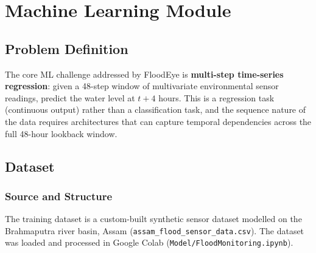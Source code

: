 ﻿%
\chapter{Machine Learning Module}

\section{Problem Definition}

The core ML challenge addressed by FloodEye is \textbf{multi-step time-series regression}: given a 48-step window of multivariate environmental sensor readings, predict the water level at $t + 4$ hours. This is a regression task (continuous output) rather than a classification task, and the sequence nature of the data requires architectures that can capture temporal dependencies across the full 48-hour lookback window.

\section{Dataset}

\subsection{Source and Structure}

The training dataset is a custom-built synthetic sensor dataset modelled on the Brahmaputra river basin, Assam (\texttt{assam\_\allowbreak{}flood\_\allowbreak{}sensor\_\allowbreak{}data.\allowbreak{}csv}). The dataset was loaded and processed in Google Colab (\texttt{Model/\allowbreak{}FloodMonitoring.\allowbreak{}ipynb}).

